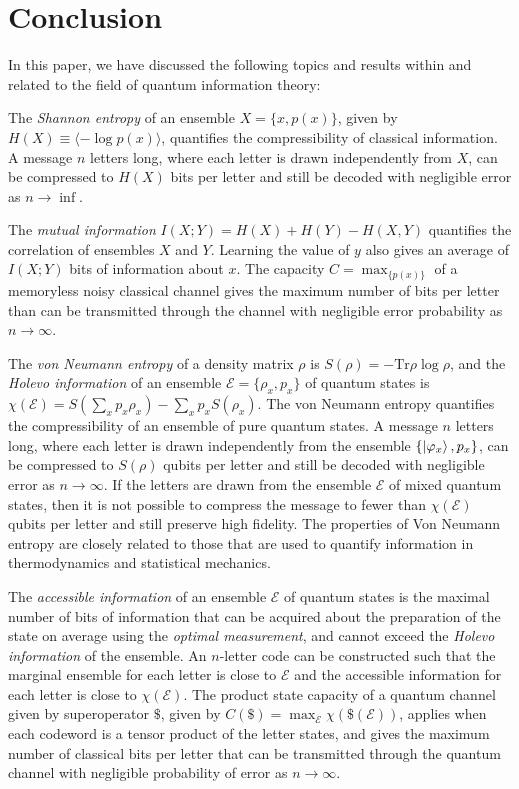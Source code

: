 \documentclass[a4paper, 12pt]{article}
\numberwithin{equation}{section}
\numberwithin{figure}{section}
\theoremstyle{definition}
\begin{document}
    \section{Conclusion}
    In this paper, we have discussed the following topics and results within and related to the field of quantum information theory: \par
    The \textit{Shannon entropy} of an ensemble $X = \{ x, p(x) \}$, given by $H(X) \equiv \langle -\log p(x) \rangle$, quantifies the compressibility of classical information. A message $n$ letters long, where each letter is drawn independently from $X$, can be compressed to $H(X)$ bits per letter and still be decoded with negligible error as $n \to \inf$. \par
    The \textit{mutual information} $I(X; Y) = H(X) + H(Y) - H(X, Y)$ quantifies the correlation of ensembles $X$ and $Y$. Learning the value of $y$ also gives an average of $I(X; Y)$ bits of information about $x$. The capacity $C = \max_{\{ p(x) \}}$ of a memoryless noisy classical channel gives the maximum number of bits per letter than can be transmitted through the channel with negligible error probability as $n \to \infty$. \par
    The \textit{von Neumann entropy} of a density matrix $\rho$ is $S(\rho) = -\text{Tr} \rho \log \rho$, and the \textit{Holevo information} of an ensemble $\mathcal{E} = \{ \rho_x, p_x \}$ of quantum states is $\chi(\mathcal{E}) = S(\sum_x p_x \rho_x) - \sum_x p_x S(\rho_x)$. The von Neumann entropy quantifies the compressibility of an ensemble of pure quantum states. A message $n$ letters long, where each letter is drawn independently from the ensemble $\{ \ket{\varphi_x}, p_x \}$, can be compressed to $S(\rho)$ qubits per letter and still be decoded with negligible error as $n \to \infty$. If the letters are drawn from the ensemble $\mathcal{E}$ of mixed quantum states, then it is not possible to compress the message to fewer than $\chi(\mathcal{E})$ qubits per letter and still preserve high fidelity. The properties of Von Neumann entropy are closely related to those that are used to quantify information in thermodynamics and statistical mechanics. \par
    The \textit{accessible information} of an ensemble $\mathcal{E}$ of quantum states is the maximal number of bits of information that can be acquired about the preparation of the state on average using the \textit{optimal measurement}, and cannot exceed the \textit{Holevo information} of the ensemble. An $n$-letter code can be constructed such that the marginal ensemble for each letter is close to $\mathcal{E}$ and the accessible information for each letter is close to $\chi(\mathcal{E})$. The product state capacity of a quantum channel given by superoperator $\$$, given by $C(\$) = \max_\mathcal{E} \chi(\$(\mathcal{E}))$, applies when each codeword is a tensor product of the letter states, and gives the maximum number of classical bits per letter that can be transmitted through the quantum channel with negligible probability of error as $n \to \infty$. \par
\end{document}
